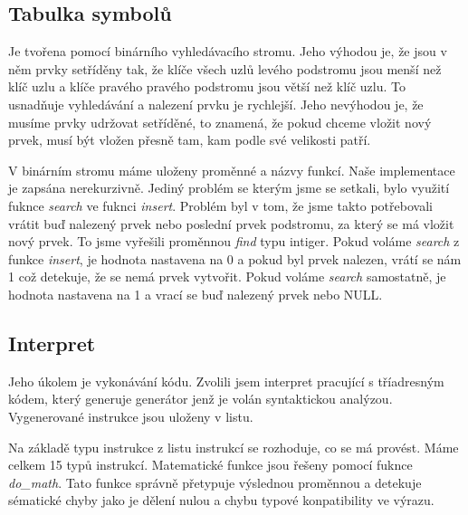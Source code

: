\documentclass[12pt,a4paper,titlepage,final]{article}
\begin{document}
\subsection{Tabulka symbolů}

Je tvořena pomocí binárního vyhledávacího stromu. Jeho výhodou je, že jsou v něm prvky setříděny tak, že klíče všech uzlů levého podstromu 
jsou menší než klíč uzlu a klíče pravého pravého podstromu jsou větší než klíč uzlu. To usnadňuje vyhledávání a nalezení prvku je rychlejší. 
Jeho nevýhodou je, že musíme prvky udržovat setříděné, to znamená, že pokud chceme vložit nový prvek, musí být vložen přesně tam, kam podle 
své velikosti patří.

V binárním stromu máme uloženy proměnné a názvy funkcí. Naše implementace je zapsána nerekurzivně. Jediný problém se kterým jsme se setkali, 
bylo využití fuknce \textit{search} ve fuknci \textit{insert}. Problém byl v tom, že jsme takto potřebovali vrátit buď nalezený prvek nebo 
poslední prvek podstromu, za který se má vložit nový prvek. To jsme vyřešili proměnnou \textit{find} typu intiger. Pokud voláme \textit{search} 
z funkce \textit{insert}, je hodnota nastavena na 0 a pokud byl prvek nalezen, vrátí se nám 1 což detekuje, že se nemá prvek vytvořit. Pokud voláme 
\textit{search} samostatně, je hodnota nastavena na 1 a vrací se buď nalezený prvek nebo NULL.

\newpage
\subsection{Interpret}

Jeho úkolem je vykonávání kódu. Zvolili jsem interpret pracující s tříadresným kódem, který generuje generátor jenž je volán syntaktickou analýzou. Vygenerované instrukce jsou uloženy v listu.

Na základě typu instrukce z listu instrukcí se rozhoduje, co se má provést. Máme celkem 15 typů instrukcí. Matematické funkce jsou řešeny pomocí fuknce \textit{do\_math}. Tato funkce správně přetypuje výslednou proměnnou a detekuje sématické chyby jako je dělení nulou a chybu typové konpatibility ve výrazu. 
\end{document}
